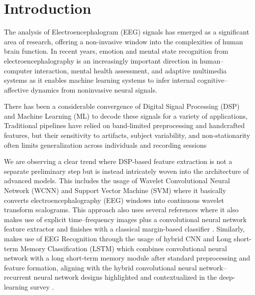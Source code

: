 \documentclass[conference]{IEEEtran}
\begin{document}
\section{Introduction}
The analysis of Electroencephalogram (EEG) signals has emerged as a significant area of research, offering a non-invasive window into the complexities of human brain function. In recent years, emotion and mental state recognition from electroencephalography is an increasingly important direction in human–computer interaction, mental health assessment, and adaptive multimedia systems as it enables machine learning systems to infer internal cognitive–affective dynamics from noninvasive neural signals. 

There has been a considerable convergence of Digital Signal Processing (DSP) and Machine Learning (ML) to decode these signals for a variety of applications, Traditional pipelines have relied on band-limited preprocessing and handcrafted features, but their sensitivity to artifacts, subject variability, and non-stationarity often limits generalization across individuals and recording sessions \cite{Hag2021StressHybridFS_Sensors,Hamzah2024HeliyonEEGERSurvey}

 We are observing a clear trend where DSP-based feature extraction is not a separate preliminary step but is instead intricately woven into the architecture of advanced models. This includes the usage of Wavelet Convolutional Neural Network (WCNN) and Support Vector Machine (SVM) \cite{Bagherzadeh2023HybridEEGWaveletCNN_SVM} where it basically converts electroencephalography (EEG) windows into continuous wavelet transform scalograms. This approach also uses several references where it also makes use of explicit time–frequency images plus a convolutional neural network feature extractor and finishes with a classical margin-based classifier \cite{Hag2021StressHybridFS_Sensors,Hamzah2024HeliyonEEGERSurvey}. Similarly, \cite{Chakravarthi2022EEGHybridCNNLSTM} makes use of EEG Recognition through the usage of hybrid CNN and Long short-term Memory Classification (LSTM) which combines convolutional neural network with a long short-term memory module after standard preprocessing and feature formation, aligning with the hybrid convolutional neural network–recurrent neural network designs highlighted and contextualized in the deep-learning survey \cite{Jung2022VR_Emotion_IJERPH}.
\end{document}
